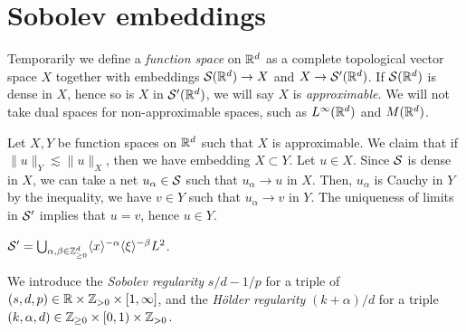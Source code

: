 \documentclass{../../large}
\begin{document}
\section{Sobolev embeddings}

Temporarily we define a \emph{function space} on $\mathbb{R}^d$ as a complete topological vector space $X$ together with embeddings $\mathcal{S}(\mathbb{R}^d)\to X$ and $X\to\mathcal{S}'(\mathbb{R}^d)$.
If $\mathcal{S}(\mathbb{R}^d)$ is dense in $X$, hence so is $X$ in $\mathcal{S}'(\mathbb{R}^d)$, we will say $X$ is \emph{approximable}.
We will not take dual spaces for non-approximable spaces, such as $L^\infty(\mathbb{R}^d)$ and $M(\mathbb{R}^d)$.

Let $X,Y$ be function spaces on $\mathbb{R}^d$ such that $X$ is approximable.
We claim that if $\|u\|_Y\lesssim\|u\|_X$, then we have embedding $X\subset Y$.
Let $u\in X$.
Since $\mathcal{S}$ is dense in $X$, we can take a net $u_\alpha\in\mathcal{S}$ such that $u_\alpha\to u$ in $X$.
Then, $u_\alpha$ is Cauchy in $Y$ by the inequality, we have $v\in Y$ such that $u_\alpha\to v$ in $Y$.
The uniqueness of limits in $\mathcal{S}'$ implies that $u=v$, hence $u\in Y$.

$\mathcal{S}'=\bigcup_{\alpha,\beta\in\mathbb{Z}_{\ge0}^d}\langle x\rangle^{-\alpha}\langle\xi\rangle^{-\beta}L^2$.

\begin{prb}
We introduce the \emph{Sobolev regularity} $s/d-1/p$ for a triple of $(s,d,p)\in\mathbb{R}\times\mathbb{Z}_{>0}\times[1,\infty]$, and the \emph{H\"older regularity} $(k+\alpha)/d$ for a triple $(k,\alpha,d)\in\mathbb{Z}_{\ge0}\times[0,1)\times\mathbb{Z}_{>0}$.
\end{prb}
\end{document}
